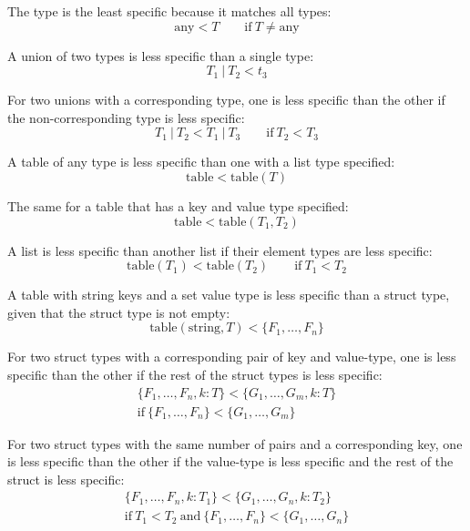 The  type is the least specific because it matches all types:
\[ \mathrm{any} < T \qquad\mathrm{if~} T \neq \mathrm{any} \]

A union of two types is less specific than a single type:
\[ T_1\ |\ T_2 < t_3 \]

For two unions with a corresponding type, one is less specific than the other if the non-corresponding type is less specific:
\[ T_1\ |\ T_2 < T_1\ |\ T_3 \qquad\mathrm{if~} T_2 < T_3 \]

A table of any type is less specific than one with a list type specified:
\[ \mathrm{table} < \mathrm{table}(T) \]

The same for a table that has a key and value type specified:
\[ \mathrm{table} < \mathrm{table}(T_1, T_2) \]

A list is less specific than another list if their element types are less specific:
\[ \mathrm{table}(T_1) < \mathrm{table}(T_2) \qquad\mathrm{if~} T_1 < T_2 \]

A table with string keys and a set value type is less specific than a struct type, given that the struct type is not empty:
\[ \mathrm{table}(\mathrm{string}, T) < \{F_1, \dots, F_n\} \]

For two struct types with a corresponding pair of key and value-type, one is less specific than the other if the rest of the struct types is less specific:
\begin{multline*}
\{F_1, \dots, F_n, k: T\} < \{G_1, \dots, G_m, k: T\} \\
\mathrm{if~} \{F_1, \dots, F_n\} < \{G_1, \dots, G_m\}
\end{multline*}

For two struct types with the same number of pairs and a corresponding key, one is less specific than the other if the value-type is less specific and the rest of the struct is less specific:
\begin{multline*}
\{F_1, \dots, F_n, k: T_1\} < \{G_1, \dots, G_n, k: T_2\} \\
\mathrm{if~} T_1 < T_2 \mathrm{~and~} \{F_1, \dots, F_n\} < \{G_1, \dots, G_n\}
\end{multline*}


